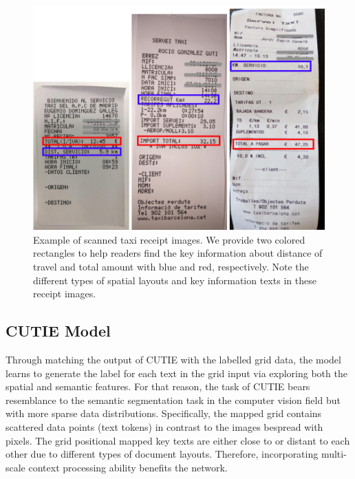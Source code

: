 \documentclass[10pt,twocolumn,letterpaper]{article}
\begin{document}
\begin{figure}
\begin{center}
\includegraphics[width=0.99\linewidth]{Receipts.png}
\end{center}
   \caption{Example of scanned taxi receipt images. We provide two colored rectangles to help readers find the key information about distance of travel and total amount with blue and red, respectively. Note the different types of spatial layouts and key information texts in these receipt images.}
\label{fig:receipts}
\end{figure}

\subsection{CUTIE Model}
Through matching the output of CUTIE with the labelled grid data, the model learns to generate the label for each text in the grid input via exploring both the spatial and semantic features. For that reason, the task of CUTIE bears resemblance to the semantic segmentation task in the computer vision field but with more sparse data distributions. Specifically, the mapped grid contains scattered data points (text tokens) in contrast to the images bespread with pixels. The grid positional mapped key texts are either close to or distant to each other due to different types of document layouts. Therefore, incorporating multi-scale context processing ability benefits the network.
\end{document}
